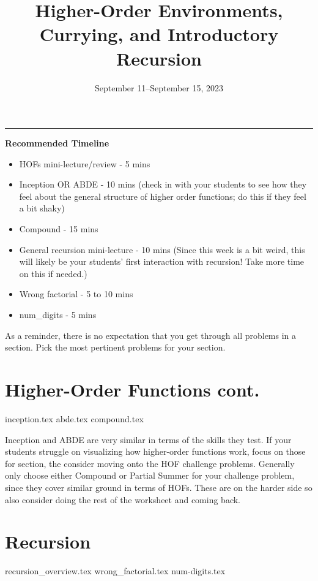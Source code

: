 \documentclass{exam}
\title{Higher-Order Environments, Currying, and Introductory Recursion}
\date{September 11--September 15, 2023}
\begin{document}
\maketitle
\rule{\textwidth}{0.15em}
\fontsize{12}{15}\selectfont

\begin{meta}
\textbf{Recommended Timeline}
\begin{itemize}
    \item HOFs mini-lecture/review - 5 mins
    \item Inception OR ABDE - 10 mins (check in with your students to see how they feel about the general structure of higher order functions; do this if they feel a bit shaky)
    \item Compound - 15 mins
    \item General recursion mini-lecture - 10 mins (Since this week is a bit weird, this will likely be your students' first interaction with recursion! Take more time on this if needed.)
    \item Wrong factorial - 5 to 10 mins
    \item num\_digits - 5 mins
\end{itemize}
As a reminder, there is no expectation that you get through all problems in a section. Pick the most pertinent problems for your section. 
\end{meta}

\begin{questions}
    \section{Higher-Order Functions cont.}
    {inception.tex}
    {abde.tex}
    {compound.tex}
    \begin{questionmeta}
        Inception and ABDE are very similar in terms of the skills they test. If your students struggle on visualizing how higher-order functions work, focus on those for section, the consider moving onto the HOF challenge problems.
        Generally only choose either Compound or Partial Summer for your challenge problem, since they cover similar ground in terms of HOFs. These are on the harder side so also consider doing the rest of the worksheet and coming back.
    \end{questionmeta}

    \section{Recursion}
    {recursion_overview.tex}
    {wrong_factorial.tex}
    {num-digits.tex}
\end{questions}
\end{document}

